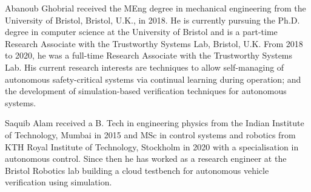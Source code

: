 \documentclass[letterpaper, 10 pt, journal, twoside]{IEEEtran}
\begin{document}
\begin{IEEEbiography}{Abanoub Ghobrial}
received the MEng degree in mechanical engineering from the University of Bristol, Bristol,  U.K., in 2018. He is currently pursuing the Ph.D. degree in computer science at the University of Bristol and is a part-time Research Associate with the Trustworthy Systems Lab, Bristol,  U.K. From 2018 to 2020, he was a full-time Research Associate with the Trustworthy Systems Lab. His current research interests are techniques to allow self-managing of autonomous safety-critical systems via continual learning during operation; and the development of simulation-based verification techniques for autonomous systems.
\end{IEEEbiography}

\begin{IEEEbiography}{Saquib Alam}
received a B. Tech  in engineering physics from the Indian Institute of Technology, Mumbai in 2015 and MSc in control systems and robotics from KTH Royal Institute of Technology, Stockholm in 2020 with a specialisation in autonomous control. Since then he has worked as a research engineer at the Bristol Robotics lab building a cloud testbench for autonomous vehicle verification using simulation. 
 \end{IEEEbiography}
\end{document}

